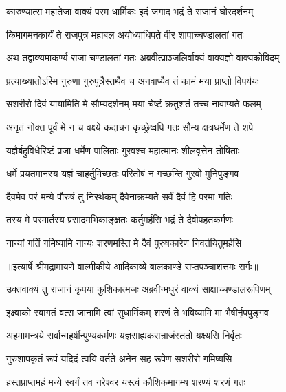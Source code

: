 \twolineshloka
{कारुण्यात्स महातेजा वाक्यं परम धार्मिकः}
{इदं जगाद भद्रं ते राजानं घोरदर्शनम्} %

\twolineshloka
{किमागमनकार्यं ते राजपुत्र महाबल}
{अयोध्याधिपते वीर शापाच्चण्डालतां गतः} %

\twolineshloka
{अथ तद्वाक्यमाकर्ण्य राजा चण्डालतां गतः}
{अब्रवीत्प्राञ्जलिर्वाक्यं वाक्यज्ञो वाक्यकोविदम्} %

\twolineshloka
{प्रत्याख्यातोऽस्मि गुरुणा गुरुपुत्रैस्तथैव च}
{अनवाप्यैव तं कामं मया प्राप्तो विपर्ययः} %

\twolineshloka
{सशरीरो दिवं यायामिति मे सौम्यदर्शनम्}
{मया चेष्टं क्रतुशतं तच्च नावाप्यते फलम्} %

\twolineshloka
{अनृतं नोक्त पूर्वं मे न च वक्ष्ये कदाचन}
{कृच्छ्रेष्वपि गतः सौम्य क्षत्रधर्मेण ते शपे} %

\twolineshloka
{यज्ञैर्बहुविधैरिष्टं प्रजा धर्मेण पालिताः}
{गुरवश्च महात्मानः शीलवृत्तेन तोषिताः} %

\twolineshloka
{धर्मे प्रयतमानस्य यज्ञं चाहर्तुमिच्छतः}
{परितोषं न गच्छन्ति गुरवो मुनिपुङ्गव} %

\twolineshloka
{दैवमेव परं मन्ये पौरुषं तु निरर्थकम्}
{दैवेनाक्रम्यते सर्वं दैवं हि परमा गतिः} %

\twolineshloka
{तस्य मे परमार्तस्य प्रसादमभिकाङ्क्षतः}
{कर्तुमर्हसि भद्रं ते दैवोपहतकर्मणः} %

\twolineshloka
{नान्यां गतिं गमिष्यामि नान्यः शरणमस्ति मे}
{दैवं पुरुषकारेण निवर्तयितुमर्हसि} %


{॥इत्यार्षे श्रीमद्रामायणे वाल्मीकीये आदिकाव्ये बालकाण्डे सप्तपञ्चाशत्तमः सर्गः॥}


\twolineshloka
{उक्तवाक्यं तु राजानं कृपया कुशिकात्मजः}
{अब्रवीन्मधुरं वाक्यं साक्षाच्चण्डालरूपिणम्} %

\twolineshloka
{इक्ष्वाको स्वागतं वत्स जानामि त्वां सुधार्मिकम्}
{शरणं ते भविष्यामि मा भैषीर्नृपपुङ्गव} %

\twolineshloka
{अहमामन्त्रये सर्वान्महर्षीन्पुण्यकर्मणः}
{यज्ञसाह्यकरान्राजंस्ततो यक्ष्यसि निर्वृतः} %

\twolineshloka
{गुरुशापकृतं रूपं यदिदं त्वयि वर्तते}
{अनेन सह रूपेण सशरीरो गमिष्यसि} %

\twolineshloka
{हस्तप्राप्तमहं मन्ये स्वर्गं तव नरेश्वर}
{यस्त्वं कौशिकमागम्य शरण्यं शरणं गतः} %

